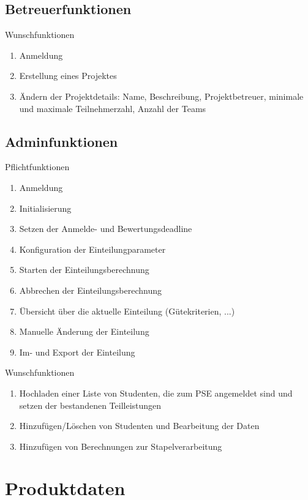 \documentclass[parskip=full]{scrartcl}
\newcommand{\swtLabel}[1]{\textbf{\textbackslash #1\arabic*0\textbackslash}}
\begin{document}
\subsection{Betreuerfunktionen}

Wunschfunktionen

\begin{enumerate}[label=\swtLabel{FA}, resume]
  \item Anmeldung
  \item Erstellung eines Projektes
  \item Ändern der Projektdetails: Name, Beschreibung, Projektbetreuer, minimale und maximale Teilnehmerzahl, Anzahl der Teams
\end{enumerate}

\subsection{Adminfunktionen}

Pflichtfunktionen

\begin{enumerate}[label=\swtLabel{FA}, resume]
  \item Anmeldung
  \item Initialisierung
  \item Setzen der Anmelde- und Bewertungsdeadline
  \item Konfiguration der Einteilungparameter
  \item Starten der Einteilungsberechnung
  \item Abbrechen der Einteilungsberechnung
  \item Übersicht über die aktuelle Einteilung (Gütekriterien, ...)
  \item Manuelle Änderung der Einteilung
  \item Im- und Export der Einteilung
\end{enumerate}

Wunschfunktionen

\begin{enumerate}[label=\swtLabel{FA}, resume]
  \item Hochladen einer Liste von Studenten, die zum PSE angemeldet sind und setzen der bestandenen Teilleistungen
  \item Hinzufügen/Löschen von Studenten und Bearbeitung der Daten
  \item Hinzufügen von Berechnungen zur Stapelverarbeitung
\end{enumerate}

\section{Produktdaten}
\end{document}
